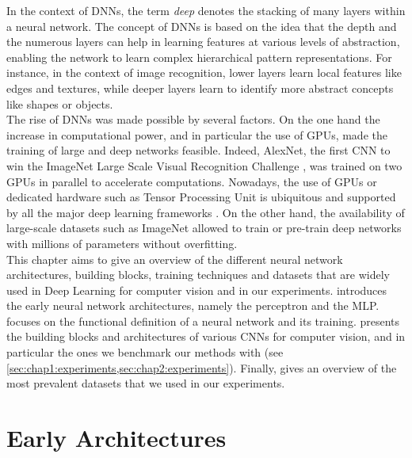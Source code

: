 In the context of \acp{DNN}, the term \emph{deep} denotes the stacking of many
layers within a neural network. The concept of \acp{DNN} is based on the idea
that the depth and the numerous layers can help in learning features at various
levels of abstraction, enabling the network to learn complex hierarchical
pattern representations. For instance, in the context of image recognition, lower layers learn
local features like edges and textures, while deeper layers learn to identify
more abstract concepts like shapes or objects.\\

The rise of \acp{DNN} was made possible by several factors. On the one hand the
increase in computational power, and in particular the use of \acp{GPU}, made
the training of large and deep networks feasible. Indeed, AlexNet, the first
\ac{CNN} to win the ImageNet Large Scale Visual Recognition Challenge
\cite{DBLP:conf/nips/KrizhevskySH12}, was trained on two \acp{GPU} in parallel
to accelerate computations. Nowadays, the use of \acp{GPU} or dedicated hardware
such as Tensor Processing Unit \cite{jouppi2017datacenter} is ubiquitous and supported by all
the major deep learning frameworks
\cite{DBLP:journals/corr/AbadiABBCCCDDDG16,DBLP:conf/nips/PaszkeGMLBCKLGA19}. On
the other hand, the availability of large-scale datasets such as ImageNet
\cite{deng2009imagenet} allowed to train or pre-train deep networks with
millions of parameters without overfitting.\\

This chapter aims to give an overview of the different neural network
architectures, building blocks, training techniques and datasets that are widely
used in Deep Learning for computer vision and in our experiments.
 introduces the early neural network
architectures, namely the perceptron and the \ac{MLP}. 
focuses on the functional definition of a neural network and its training.
 presents the building blocks and architectures of various
\acp{CNN} for computer vision, and in particular the ones we benchmark our
methods with (see \cref{sec:chap1:experiments,sec:chap2:experiments}). Finally,
 gives an overview of the most prevalent datasets that we
used in our experiments.


\section{Early Architectures}\label{sec:dlo:early_architectures}


